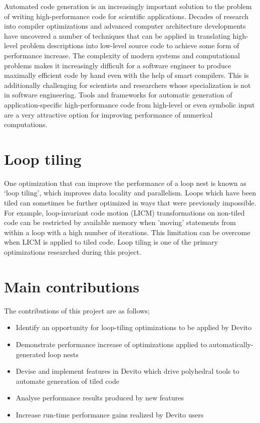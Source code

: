 \documentclass[a4paper,12pt,twoside]{report}
\begin{document}
Automated code generation is an increasingly important solution to the problem of writing high-performance code
for scientific applications. Decades of research into compiler optimizations and advanced computer architecture developments
have uncovered a number of techniques that can be applied in translating high-level problem descriptions into low-level source code
to achieve some form of performance increase. The complexity of modern systems and computational problems makes it increasingly 
difficult for a software engineer to produce maximally efficient code by hand even with the help of smart
compilers. This is additionally challenging for scientists and researchers whose specialization is not in software engineering. Tools
and frameworks for automatic generation of application-specific high-performance code from high-level or even symbolic input are a very
attractive option for improving performance of numerical computations.


\section{Loop tiling}
One optimization that can improve the performance of a loop nest is known as `loop tiling', which improves data locality and parallelism.
Loops which have been tiled can sometimes be further optimized in ways that were previously impossible. For example, 
loop-invariant code motion (LICM) transformations on non-tiled code can be restricted by available memory when 'moving'
statements from within a loop with a high number of iterations. This limitation can be overcome when LICM is applied to tiled code.
Loop tiling is one of the primary optimizations researched during this project.

\section{Main contributions}
The contributions of this project are as follows;
\begin{itemize}
	\item{Identify an opportunity for loop-tiling optimizations to be applied by Devito}
	\item{Demonstrate performance increase of optimizations applied to automatically-generated loop nests}
	\item{Devise and implement features in Devito which drive polyhedral tools to automate generation of tiled code}
	\item{Analyse performance results produced by new features}
	\item{Increase run-time performance gains realized by Devito users}
\end{itemize}
\end{document}
